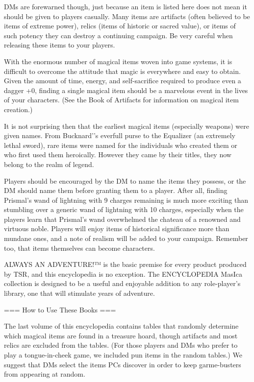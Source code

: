 DMs are forewarned though, just because an item is listed here does not mean it should be given to players casually. Many items are artifacts (often believed to be items of extreme power), relics (items of historic or sacred value), or items of such potency they can destroy a continuing campaign. Be very careful when releasing these items to your players.

With the enormous number of magical items woven into game systems, it is difficult to overcome the attitude that magic is everywhere and easy to obtain. Given the amount of time, energy, and self-sacrifice required to produce even a dagger +0, finding a single magical item should be a marvelous event in the lives of your characters. (See the Book of Artifacts for information on magical item creation.)

It is not surprising then that the earliest magical items (especially weapons) were given names. From Bucknard'’s everfull purse to the Equalizer (an extremely lethal sword), rare items were named for the individuals who created them or who first used them heroically. However they came by their titles, they now belong to the realm of legend.

Players should be encouraged by the DM to name the items they possess, or the DM should name them before granting them to a player. After all, finding Prismal’s wand of lightning with 9 charges remaining is much more exciting than stumbling over a generic wand of lightning with 10 charges, especially when the players learn that Prismal’s wand overwhelmed the chateau of a renowned and virtuous noble. Players will enjoy items of historical significance more than mundane ones, and a note of realism will be added to your campaign. Remember too, that items themselves can become characters.

ALWAYS AN ADVENTURE!™ is the basic premise for every product produced by TSR, and this encyclopedia is no exception. The ENCYCLOPEDIA MasIca collection is designed to be a useful and enjoyable addition to any role-player’s library, one that will stimulate years of adventure.

=== How to Use These Books ===

The last volume of this encyclopedia contains tables that randomly determine which magical items are found in a treasure hoard, though artifacts and most relics are excluded from the tables. (For those players and DMs who prefer to play a tongue-in-cheek game, we included pun items in the random tables.) We suggest that DMs select the items PCs discover in order to keep garme-busters from appearing at random.

